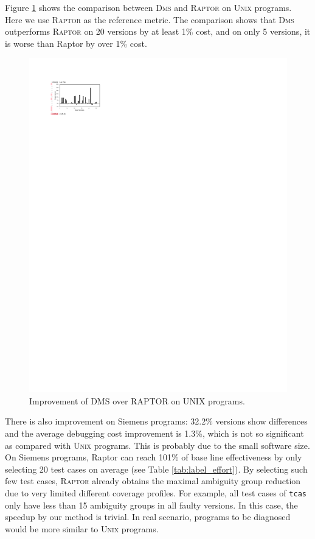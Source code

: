 \vspace{0.2cm}
Figure \ref{fig:our_vs_ag_unix} shows the comparison between \textsc{Dms} and \textsc{Raptor} on \textsc{Unix} programs.
Here we use \textsc{Raptor} as the reference metric. The comparison shows that \textsc{Dms} 
outperforms \textsc{Raptor} on 20 versions by at least 1\% cost,
and on only 5 versions, it is worse than {\sc Raptor} by over 1\% cost.

\begin{figure}[tbp]
    \centering
    \includegraphics[width=12cm]{our_vs_ag_unix.pdf}
    \caption{Improvement of D{\scriptsize MS} over R{\scriptsize APTOR} on U{\scriptsize NIX} programs.}
    \label{fig:our_vs_ag_unix}
\end{figure}

There is also improvement on Siemens programs: 32.2\% versions show differences and the average debugging cost improvement is 1.3\%, which is not so significant as compared with \textsc{Unix} programs.
This is probably due to the small software size. On Siemens programs, {\sc Raptor}
can reach 101\% of base line effectiveness by only selecting 20 test cases on average (see Table \ref{tab:label_effort}).
By selecting such few test cases, \textsc{Raptor} already obtains the maximal ambiguity group reduction due to very limited different
coverage profiles. For example, all test cases of \texttt{tcas} only have less than 15 ambiguity groups in all faulty versions. In this case,
the speedup by our method is trivial. In real scenario, programs to be diagnosed would be more similar to \textsc{Unix} programs.
